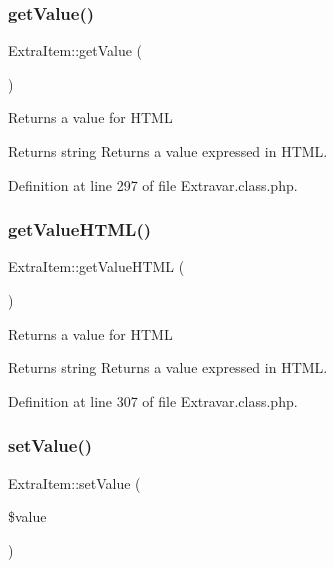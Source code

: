 \mbox{\label{classExtraItem_a61ff542aa57144ac9e8d20d40f426486}} 
\subsubsection{\texorpdfstring{get\+Value()}{getValue()}}
{\footnotesize\ttfamily Extra\+Item\+::get\+Value (\begin{DoxyParamCaption}{ }\end{DoxyParamCaption})}

Returns a value for H\+T\+ML

\begin{DoxyReturn}{Returns}
string Returns a value expressed in H\+T\+ML. 
\end{DoxyReturn}


Definition at line 297 of file Extravar.\+class.\+php.

\mbox{\label{classExtraItem_a7784f081919e81e4a41ab0c250d6ca52}} 
\subsubsection{\texorpdfstring{get\+Value\+H\+T\+M\+L()}{getValueHTML()}}
{\footnotesize\ttfamily Extra\+Item\+::get\+Value\+H\+T\+ML (\begin{DoxyParamCaption}{ }\end{DoxyParamCaption})}

Returns a value for H\+T\+ML

\begin{DoxyReturn}{Returns}
string Returns a value expressed in H\+T\+ML. 
\end{DoxyReturn}


Definition at line 307 of file Extravar.\+class.\+php.

\mbox{\label{classExtraItem_a6bec289dc0622bd882a36cb9b5680b03}} 
\subsubsection{\texorpdfstring{set\+Value()}{setValue()}}
{\footnotesize\ttfamily Extra\+Item\+::set\+Value (\begin{DoxyParamCaption}\item[{}]{\$value }\end{DoxyParamCaption})}


